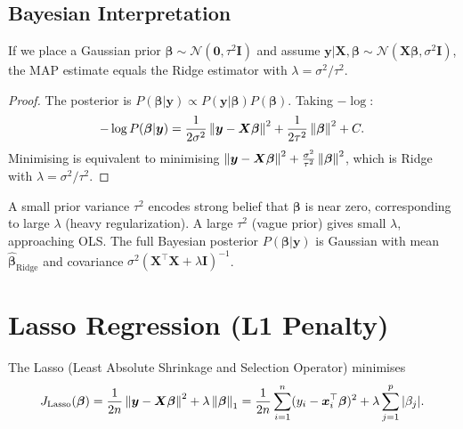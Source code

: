\subsection{Bayesian Interpretation}

\begin{proposition}
If we place a Gaussian prior $\bm{\beta} \sim \mathcal{N}(\bm{0}, \tau^2\bm{I})$ and assume $\bm{y}|\bm{X},\bm{\beta} \sim \mathcal{N}(\bm{X}\bm{\beta}, \sigma^2\bm{I})$, the MAP estimate equals the Ridge estimator with $\lambda = \sigma^2/\tau^2$.
\end{proposition}

\begin{proof}
The posterior is $P(\bm{\beta}|\bm{y}) \propto P(\bm{y}|\bm{\beta})P(\bm{\beta})$. Taking $-\log$:
\[
    -\log P(\bm{\beta}|\bm{y}) = \frac{1}{2\sigma^2}\left\| \bm{y}-\bm{X}\bm{\beta} \right\|^2 + \frac{1}{2\tau^2}\left\| \bm{\beta} \right\|^2 + C.
\]
Minimising is equivalent to minimising $\left\| \bm{y}-\bm{X}\bm{\beta} \right\|^2 + \frac{\sigma^2}{\tau^2}\left\| \bm{\beta} \right\|^2$, which is Ridge with $\lambda = \sigma^2/\tau^2$.
\end{proof}

\begin{intuition}[title=\textbf{Bayesian Perspective}]
A small prior variance $\tau^2$ encodes strong belief that $\bm{\beta}$ is near zero, corresponding to large $\lambda$ (heavy regularization). A large $\tau^2$ (vague prior) gives small $\lambda$, approaching OLS. The full Bayesian posterior $P(\bm{\beta}|\bm{y})$ is Gaussian with mean $\hat{\bm{\beta}}_{\text{Ridge}}$ and covariance $\sigma^2(\bm{X}^\top\bm{X}+\lambda\bm{I})^{-1}$.
\end{intuition}

\section{Lasso Regression (L1 Penalty)}

\begin{definition}
The Lasso (Least Absolute Shrinkage and Selection Operator) minimises
\[
    J_{\text{Lasso}}(\bm{\beta})
    = \frac{1}{2n}\left\| \bm{y} - \bm{X}\bm{\beta} \right\|^2 + \lambda\left\| \bm{\beta} \right\|_1
    = \frac{1}{2n}\sum_{i=1}^{n}(y_i - \bm{x}_i^\top\bm{\beta})^2 + \lambda\sum_{j=1}^{p}|\beta_j|.
\]
\end{definition}

